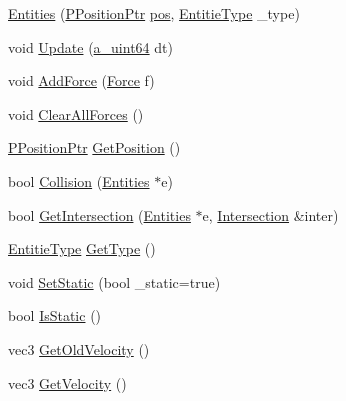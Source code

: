 \begin{DoxyCompactItemize}
\item 
\hyperlink{class_agmd_physics_1_1_entities_ae06dde45e630ed18d2976696e8c98439}{Entities} (\hyperlink{namespace_agmd_physics_a72f849383bbb96be02fec5a53333d7fd}{P\+Position\+Ptr} \hyperlink{_examples_2_planet_2_app_8cpp_aa8a1c0491559faca4ebd0881575ae7f0}{pos}, \hyperlink{namespace_agmd_physics_ad084e24011be0a7009fedc9ed9ee92ed}{Entitie\+Type} \+\_\+type)
\item 
void \hyperlink{class_agmd_physics_1_1_entities_a325d324b384129d56416d8d4b2ccbef3}{Update} (\hyperlink{_common_defines_8h_a6c5192ec3c55d6e5b13d2dbaa082bdea}{a\+\_\+uint64} dt)
\item 
void \hyperlink{class_agmd_physics_1_1_entities_ade37092eac084d2cc8a9eb3fd8881f70}{Add\+Force} (\hyperlink{class_agmd_physics_1_1_force}{Force} f)
\item 
void \hyperlink{class_agmd_physics_1_1_entities_a0e6a72afc89f6e72961c0014ded4e34d}{Clear\+All\+Forces} ()
\item 
\hyperlink{namespace_agmd_physics_a72f849383bbb96be02fec5a53333d7fd}{P\+Position\+Ptr} \hyperlink{class_agmd_physics_1_1_entities_a95feafafef661cb1c7811004d0da1284}{Get\+Position} ()
\item 
bool \hyperlink{class_agmd_physics_1_1_entities_a0b8b039fb6f13dd66a17d146fa4baf97}{Collision} (\hyperlink{class_agmd_physics_1_1_entities}{Entities} $\ast$e)
\item 
bool \hyperlink{class_agmd_physics_1_1_entities_a0076c27b9ef6f90c8de917c0f3cc1189}{Get\+Intersection} (\hyperlink{class_agmd_physics_1_1_entities}{Entities} $\ast$e, \hyperlink{struct_agmd_physics_1_1_intersection}{Intersection} \&inter)
\item 
\hyperlink{namespace_agmd_physics_ad084e24011be0a7009fedc9ed9ee92ed}{Entitie\+Type} \hyperlink{class_agmd_physics_1_1_entities_a7e99e93cf6c3f1f915e186f8d2ca4ab8}{Get\+Type} ()
\item 
void \hyperlink{class_agmd_physics_1_1_entities_a65e43c1e569e831c2ebcefe1791a52c6}{Set\+Static} (bool \+\_\+static=true)
\item 
bool \hyperlink{class_agmd_physics_1_1_entities_a7e2166d5442e065000757f4c6a0f10cf}{Is\+Static} ()
\item 
vec3 \hyperlink{class_agmd_physics_1_1_entities_afc5fac5ee33c6356a73de2f253ef6a18}{Get\+Old\+Velocity} ()
\item 
vec3 \hyperlink{class_agmd_physics_1_1_entities_a625d621c72737e046b44941164922b43}{Get\+Velocity} ()
\end{DoxyCompactItemize}
